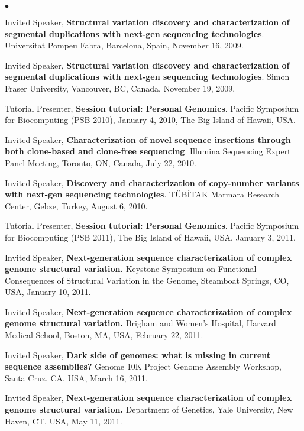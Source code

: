 \documentclass[margin,line]{res}
\newenvironment{list2}{
  \begin{list}{$\bullet$}{%
      \setlength{\itemsep}{0in}
      \setlength{\parsep}{0in} \setlength{\parskip}{0in}
      \setlength{\topsep}{0in} \setlength{\partopsep}{0in} 
      \setlength{\leftmargin}{0.2in}}}{\end{list}}
\begin{document}
\begin{resume}
\begin{list2}
\item 
  Invited Speaker, {\bf Structural variation discovery and characterization of segmental duplications with next-gen sequencing technologies}.
  Universitat Pompeu Fabra,
  Barcelona, Spain, November 16, 2009.


\item 
  Invited Speaker, {\bf Structural variation discovery and characterization of segmental duplications with next-gen sequencing technologies}.
  Simon Fraser University,
  Vancouver, BC, Canada, November 19, 2009.
\item 
  Tutorial Presenter, {\bf Session tutorial: Personal Genomics}.
  Pacific Symposium for Biocomputing (PSB 2010),
  January 4, 2010, The Big Island of Hawaii, USA.
\item
  Invited Speaker, {\bf Characterization of novel sequence insertions through both clone-based and clone-free sequencing}. Illumina Sequencing Expert Panel Meeting, 
  Toronto, ON, Canada, July 22, 2010.

\item
  Invited Speaker, {\bf Discovery and characterization of copy-number variants with next-gen sequencing technologies}.
  T\"{U}B\'{I}TAK Marmara Research Center, Gebze, Turkey, August 6, 2010.

\item 
  Tutorial Presenter, {\bf Session tutorial: Personal Genomics}.
  Pacific Symposium for Biocomputing (PSB 2011),
  The Big Island of Hawaii, USA,   January 3, 2011.

\item
  Invited Speaker, 
  {\bf  Next-generation sequence characterization of complex genome structural variation.}
  Keystone Symposium on Functional Consequences of Structural Variation in the Genome,
  Steamboat Springs, CO, USA, January 10, 2011.


\item
  Invited Speaker, 
  {\bf  Next-generation sequence characterization of complex genome structural variation.}
 Brigham and Women's Hospital, Harvard Medical School, Boston, MA, USA, February 22, 2011.

\item
  Invited Speaker, 
  {\bf Dark side of genomes: what is missing in current sequence assemblies?}
  Genome 10K Project Genome Assembly Workshop, Santa Cruz, CA, USA, March 16, 2011.

\item
  Invited Speaker, 
  {\bf  Next-generation sequence characterization of complex genome structural variation.}
  Department of Genetics, Yale University, New Haven, CT, USA, May 11, 2011.


\end{list2}
\end{resume}
\end{document}
